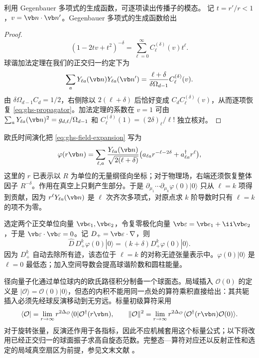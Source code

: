 利用 Gegenbauer 多项式的生成函数，可逐项读出传播子的模态。
记 $t=r'/r<1$，$v=\vb n\cdot\vb n'$。Gegenbauer 多项式的生成函数给出
\begin{proof}
\begin{equation*}
(1-2tv+t^2)^{-\delta}=\sum_{\ell=0}^\infty C_\ell^{(\delta)}(v)t^\ell.
\end{equation*}
球谐加法定理在我们的正交归一约定下为
\begin{equation*}
\sum_aY_{\ell a}(\vb n)Y_{\ell a}(\vb n')
=\frac{\ell+\delta}{\delta\Omega_{d-1}}C_\ell^{(\delta)}(v).
\end{equation*}
由 $\delta\Omega_{d-1}C_d=1/2$，右侧除以 $2(\ell+\delta)$ 后恰好变成 $C_d C_\ell^{(\delta)}(v)$，从而逐项恢复 \cref{eq:ghs-propagator}。加法定理的系数在 $v=1$ 可由 $\sum_aY_{\ell a}(\vb n)^2=g_{d,\ell}/\Omega_{d-1}$ 和 $C_\ell^{(\delta)}(1)=(2\delta)_\ell/\ell!$ 独立核对。
\end{proof}

欧氏时间演化把 \cref{eq:ghs-field-expansion} 写为
\begin{equation}\label{eq:ghs-radial-field-expansion}
 \varphi(r\vb n)=\sum_{\ell,a}\frac{Y_{\ell a}(\vb n)}{\sqrt{2(\ell+\delta)}}
 \bigl(a_{\ell a}r^{-\ell-2\delta}+a_{\ell a}^\dagger r^\ell\bigr),
\end{equation}
这里的 $r$ 已表示以 $R$ 为单位的无量纲径向坐标；对于物理场，右端还须恢复整体因子 $R^{-\delta}$。作用在真空上只剩产生部分。于是 $\partial_{\mu_1}\cdots\partial_{\mu_k}\varphi(0)|0\rangle$ 只从 $\ell=k$ 项得到贡献，因为 $r^\ell Y_{\ell a}(\vb n)$ 是 $\ell$ 次齐次多项式，对原点求 $k$ 阶导数时只有 $\ell=k$ 的项不为零。

选定两个正交单位向量 $\vb e_1,\vb e_2$，令复零极化向量 $\vb\varepsilon=\vb e_1+\ii\vb e_2$，于是 $\vb\varepsilon\cdot\vb\varepsilon=0$。记 $D_+=\vb\varepsilon\cdot\nabla$，则
\begin{equation}\label{eq:ghs-oneparticle-dimension}
 \widehat D\,D_+^k\varphi(0)|0\rangle
 =(k+\delta)D_+^k\varphi(0)|0\rangle.
\end{equation}
因为 $D_+^k$ 自动去除所有迹，该态位于 $\ell=k$ 的对称无迹张量表示中。$\varphi(0)|0\rangle$ 是 $\ell=0$ 最低态；加入空间导数会提高球谐阶数和圆柱能量。


径向量子化通过单位球内的欧氏路径积分制备一个球面态。局域插入 $\mathcal O(0)$ 的定义是 $|\mathcal O\rangle=\mathcal O(0)|0\rangle$，但态的内积不能用同一点处的算符乘积直接给出：其共轭插入必须先经球反演移动到无穷远。标量初级算符采用
\begin{equation}\label{eq:ghs-radial-adjoint}
 \langle\mathcal O|=\lim_{r\to\infty}r^{2\Delta_{\mathcal O}}
 \langle0|\mathcal O^\dagger(r\vb n),\qquad
 \|\mathcal O\|^2=\lim_{r\to\infty}r^{2\Delta_{\mathcal O}}
 \langle\mathcal O^\dagger(r\vb n)\mathcal O(0)\rangle.
\end{equation}
对于旋转张量，反演还作用于各指标，因此不应机械套用这个标量公式；以下将改用已经正交归一的球面振子求高自旋态范数。完整态—算符对应还以反射正性和选定的局域真空扇区为前提，参见文末文献 \cite{ghs-rychkov,ghs-simmons}。

